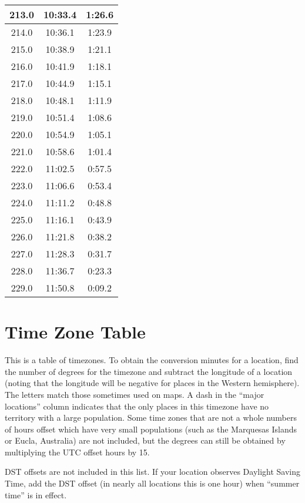 \begin{footnotesize}
\begin{minipage}{0.25\textwidth}
\begin{tabular}[t]{c|c|c}
	213.0&10:33.4&1:26.6\\\hline
	214.0&10:36.1&1:23.9\\\hline
	215.0&10:38.9&1:21.1\\\hline
	216.0&10:41.9&1:18.1\\\hline
	217.0&10:44.9&1:15.1\\\hline
	218.0&10:48.1&1:11.9\\\hline
	219.0&10:51.4&1:08.6\\\hline
	220.0&10:54.9&1:05.1\\\hline
	221.0&10:58.6&1:01.4\\\hline
	222.0&11:02.5&0:57.5\\\hline
	223.0&11:06.6&0:53.4\\\hline
	224.0&11:11.2&0:48.8\\\hline
	225.0&11:16.1&0:43.9\\\hline
	226.0&11:21.8&0:38.2\\\hline
	227.0&11:28.3&0:31.7\\\hline
	228.0&11:36.7&0:23.3\\\hline
	229.0&11:50.8&0:09.2\\\hline
\end{tabular}\end{minipage}\newpage
\end{footnotesize}

\section{Time Zone Table}

This is a table of timezones. To obtain the conversion minutes for a location, find the number of degrees for the timezone and subtract the longitude of a location (noting that the longitude will be negative for places in the Western hemisphere). The letters match those sometimes used on maps. A dash in the “major locations” column indicates that the only places in this timezone have no territory with a large population. Some time zones that are not a whole numbers of hours offset which have very small populations (such as the Marquesas Islands or Eucla, Australia) are not included, but the degrees can still be obtained by multiplying the UTC offset hours by 15.

DST offsets are not included in this list.  If your location observes Daylight Saving Time, add the DST offset (in nearly all locations this is one hour) when “summer time” is in effect.


